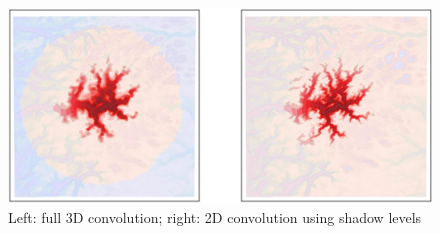 \documentclass[12pt]{scrartcl}
\begin{document}
\begin{figure}[h!]
\centering
\includegraphics[width=\textwidth]{small.jpg}
\caption{Left: full 3D convolution; right: 2D convolution using shadow levels} \label{fig:small}
\end{figure}
\end{document}
